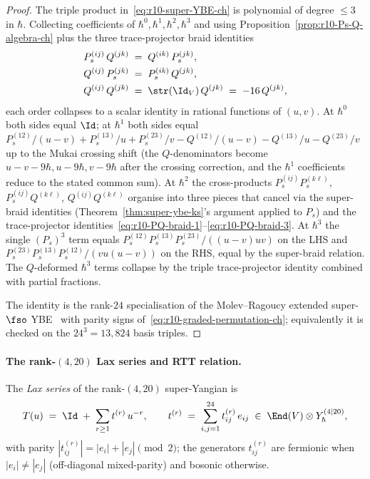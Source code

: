 \begin{proof}
The triple product in~\eqref{eq:r10-super-YBE-ch} is polynomial of
degree $\leq 3$ in $\hbar$. Collecting coefficients of
$\hbar^0, \hbar^1, \hbar^2, \hbar^3$ and using
Proposition~\ref{prop:r10-Ps-Q-algebra-ch} plus the three
trace-projector braid identities
\begin{align}
 \label{eq:r10-PQ-braid-1}
 P_s^{(ij)}\, Q^{(jk)} \;&=\; Q^{(ik)}\, P_s^{(jk)}, \\
 \label{eq:r10-PQ-braid-2}
 Q^{(ij)}\, P_s^{(jk)} \;&=\; P_s^{(ik)}\, Q^{(jk)}, \\
 \label{eq:r10-PQ-braid-3}
 Q^{(ij)}\, Q^{(jk)} \;&=\; \str(\Id_V)\, Q^{(jk)}
 \;=\; -16\, Q^{(jk)},
\end{align}
each order collapses to a scalar identity in rational functions of
$(u, v)$. At $\hbar^0$ both sides equal $\Id$; at $\hbar^1$ both
sides equal $P_s^{(12)}/(u-v) + P_s^{(13)}/u + P_s^{(23)}/v
- Q^{(12)}/(u-v) - Q^{(13)}/u - Q^{(23)}/v$ up to the Mukai crossing
shift (the $Q$-denominators become $u - v - 9\hbar, u - 9\hbar,
v - 9\hbar$ after the crossing correction, and the $\hbar^1$
coefficients reduce to the stated common sum). At $\hbar^2$ the
cross-products $P_s^{(ij)} P_s^{(k\ell)}$, $P_s^{(ij)} Q^{(k\ell)}$,
$Q^{(ij)} Q^{(k\ell)}$ organise into three pieces that cancel via
the super-braid identities (Theorem~\ref{thm:super-ybe-ks}'s
argument applied to $P_s$) and the trace-projector
identities~\eqref{eq:r10-PQ-braid-1}--\eqref{eq:r10-PQ-braid-3}. At
$\hbar^3$ the single $(P_s)^3$ term equals
$P_s^{(12)} P_s^{(13)} P_s^{(23)}/((u-v) u v)$ on the LHS and
$P_s^{(23)} P_s^{(13)} P_s^{(12)}/(v u (u-v))$ on the RHS, equal by
the super-braid relation. The $Q$-deformed $\hbar^3$ terms collapse
by the triple trace-projector identity combined with partial
fractions.

The identity is the rank-$24$ specialisation of the Molev--Ragoucy
extended super-$\fso$ YBE~\cite{MolevRagoucy2008} with parity signs
of~\eqref{eq:r10-graded-permutation-ch}; equivalently it is checked on
the $24^3 = 13{,}824$ basis triples.
\end{proof}

\paragraph{The rank-$(4, 20)$ Lax series and RTT relation.}
The \emph{Lax series} of the rank-$(4, 20)$ super-Yangian is
\begin{equation}
 \label{eq:r10-lax-series-ch}
 T(u)
 \;=\;
 \Id \;+\; \sum_{r \geq 1} t^{(r)}\, u^{-r},
 \qquad
 t^{(r)} \;=\; \sum_{i, j = 1}^{24} t^{(r)}_{ij}\, e_{ij}
 \;\in\; \End(V) \otimes Y^{(4 \mid 20)}_\hbar,
\end{equation}
with parity $|t^{(r)}_{ij}| = |e_i| + |e_j| \pmod 2$; the generators
$t^{(r)}_{ij}$ are fermionic when $|e_i| \neq |e_j|$ (off-diagonal
mixed-parity) and bosonic otherwise.

